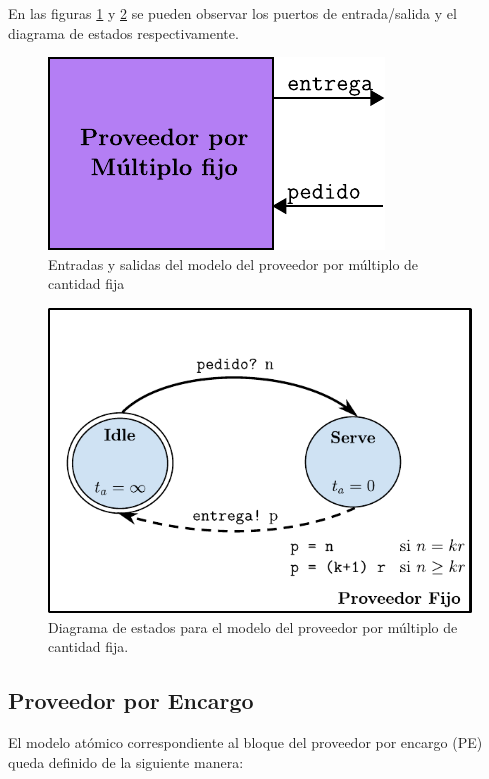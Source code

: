 \documentclass[10pt]{article}
\begin{document}
En las figuras \ref{fig:PF-esquematico} y \ref{fig:PF-estados} se pueden observar los puertos de entrada/salida y el diagrama de estados respectivamente.

\begin{figure}[htbp]
	\centering
	\includegraphics{img/PF-esquematico}
	\caption{Entradas y salidas del modelo del proveedor por múltiplo de cantidad fija}
	\label{fig:PF-esquematico}
\end{figure}

\begin{figure}[htbp]
	\centering
	\includegraphics{img/proveedorFijodevsgraph}
	\caption{Diagrama de estados para el modelo del proveedor por múltiplo de cantidad fija.}
	\label{fig:PF-estados}
\end{figure}

\subsection{Proveedor por Encargo\label{sec:PE}}
El modelo atómico correspondiente al bloque del proveedor por encargo (PE) queda definido de la siguiente manera:
\end{document}
